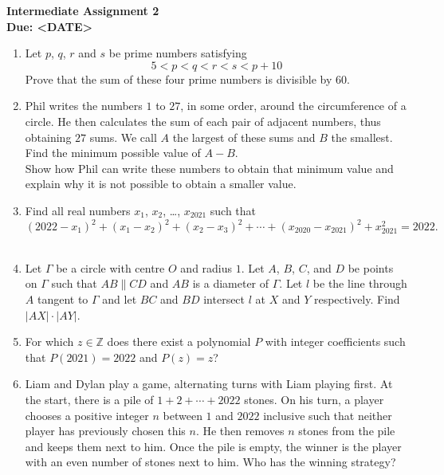 \documentclass{article}
\begin{document}
\thispagestyle{empty}

\begin{center}
  \textbf{\Large Intermediate Assignment 2}
  \\ \vspace{1em}
  \textbf{\large Due: <DATE>}
\end{center}

\bigskip

\begin{enumerate}[itemsep=\fill]


\item %
Let $p$, $q$, $r$ and $s$ be prime numbers satisfying
$$5 < p < q < r < s < p+10$$
Prove that the sum of these four prime numbers is divisible by $60$.


		
\item %
Phil writes the numbers $1$ to $27$, in some order, around the circumference of a circle. 
He then calculates the sum of each pair of adjacent numbers, thus obtaining $27$ sums. 
We call $A$ the largest of these sums and $B$ the smallest. 
\\ Find the minimum possible value of $A-B$.
\\ Show how Phil can write these numbers to obtain that minimum value and explain why it is
not possible to obtain a smaller value.


\item %
Find all real numbers $x_1$, $x_2$, \ldots, $x_{2021}$ such that
\[ (2022-x_1)^2 +(x_1-x_2)^2 +(x_2-x_3)^2 +\dotsb +(x_{2020}-x_{2021})^2 +x_{2021}^2 = 2022. \]~


\item %
Let $\Gamma$ be a circle with centre $O$ and radius $1$.
Let $A$, $B$, $C$, and $D$ be points on $\Gamma$ such that $AB \parallel CD$ and $AB$ is a diameter of $\Gamma$.
Let $l$ be the line through $A$ tangent to $\Gamma$ and let $BC$ and $BD$ intersect $l$ at $X$ and $Y$ respectively.
Find $|AX| \cdot |AY|$.


\item %
For which $z \in \mathbb{Z}$ does there exist a polynomial $P$ with integer coefficients such that $P(2021) = 2022$ and $P(z) = z$?


\item %
Liam and Dylan play a game, alternating turns with Liam playing first.
At the start, there is a pile of $1 +2 +\dotsb +2022$ stones.
On his turn, a player chooses a positive integer $n$ between $1$ and $2022$ inclusive such that neither player has previously chosen this $n$.
He then removes $n$ stones from the pile and keeps them next to him.
Once the pile is empty, the winner is the player with an even number of stones next to him.
Who has the winning strategy? 

\end{enumerate}
\end{document}
